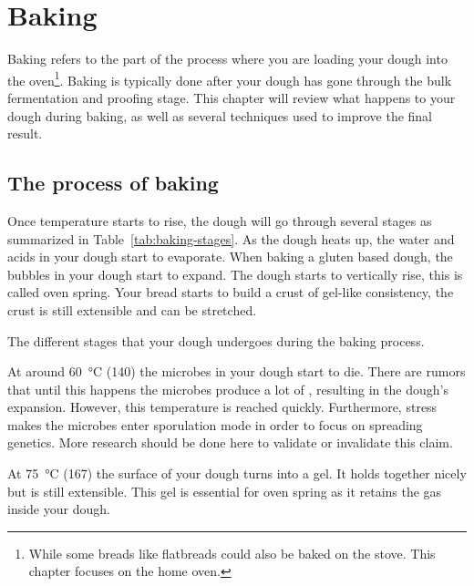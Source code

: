 \chapter{Baking}%
\label{ch:baking}
\begin{quoting}
Baking refers to the part of the process where you are loading your dough into
the oven\footnote{While some breads like flatbreads could also be baked on the
stove. This chapter focuses on the home oven.}.  Baking is typically done after
your dough has gone through the bulk fermentation and proofing stage.  This
chapter will review what happens to your dough during baking, as well as
several techniques used to improve the final result.
\end{quoting}

\section{The process of baking}
Once temperature starts to rise, the dough will go through several stages as
summarized in Table~\ref{tab:baking-stages}.  As the dough heats up, the water
and acids in your dough start to evaporate. When baking a gluten based dough,
the bubbles in your dough start to expand.  The dough starts to vertically
rise, this is called oven spring.  Your bread starts to build a crust of
gel-like consistency, the crust is still extensible and can be stretched.

\begin{table}[htp!]
    \centering
        
        \caption[Stages of dough during baking]{The different stages that
            your dough undergoes during the baking process.}%
        \label{tab:baking-stages}
\end{table}

At around  \qty{60}{\degreeCelsius} (\qty{140}{\degF}) the microbes in your dough start to die.
There are rumors that until this happens the microbes produce
a lot of , resulting in the dough's expansion. However, this temperature
is reached quickly. Furthermore, stress makes the microbes
enter sporulation mode in order to focus on spreading genetics.
More research should be done here to validate or invalidate this
claim.

At  \qty{75}{\degreeCelsius} (\qty{167}{\degF}) the surface of your dough turns into a gel. It
holds together nicely but is still extensible. This gel is essential
for oven spring as it retains the gas inside your dough.

